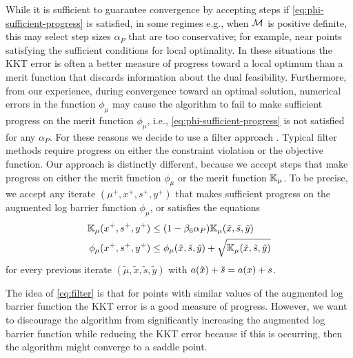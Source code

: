 \documentclass{article}
\begin{document}
While it is sufficient to guarantee convergence by accepting steps if \eqref{eq:phi-sufficient-progress} is satisfied, in some regimes e.g., when $\mathcal{M}$ is positive definite, this may select step sizes $\alpha_{P}$ that are too conservative;  for example, near points satisfying the sufficient conditions for local optimality. In these situations the KKT error is often a better measure of progress toward a local optimum than a merit function that discards information about the dual feasibility. Furthermore, from our experience, during convergence toward an optimal solution, numerical errors in the function $\phi_{\mu}$ may cause the algorithm to fail to make sufficient progress on the merit function $\phi_{\mu}$, i.e., \eqref{eq:phi-sufficient-progress} is not satisfied for any $\alpha_{P}$. For these reasons we decide to use a filter approach \cite{fletcher2002nonlinear,wachter2006implementation}. Typical filter methods \cite{fletcher2002nonlinear} require progress on either the constraint violation or the objective function. Our approach is distinctly different, because we accept steps that make progress on either the merit function $\phi_{\mu}$ or the merit function $\mathbb{K}_{\mu}$.
To be precise, we accept any iterate $(\mu^{+}, x^{+}, s^{+}, y^{+})$ that makes sufficient progress on the augmented log barrier function $\phi_{\mu}$, or satisfies the equations
\begin{subequations}\label{eq:filter}
\begin{flalign}
\meritKKT_{\mu} (x^{+}, s^{+}, y^{+}) &\le (1 - \parKKTReductFactor \alpha_{P} ) \meritKKT_{\mu} (\tilde{x}, \tilde{s}, \tilde{y}) \label{eq:kkt-progress} \\
\phi_{\mu}(x^{+}, s^{+}, y^{+}) &\le \phi_{\mu}(\tilde{x}, \tilde{s}, \tilde{y}) + \sqrt{\meritKKT_{\mu} (\tilde{x}, \tilde{s}, \tilde{y})} %
\end{flalign} %
\end{subequations}
 for every previous iterate $(\tilde{\mu}, \tilde{x}, \tilde{s}, \tilde{y})$ with $a(\tilde{x}) + \tilde{s} = a(x) + s$.

The idea of \eqref{eq:filter} is that for points with similar values of the augmented log barrier function the KKT error is a good measure of progress. However, we want to discourage the algorithm from significantly increasing the augmented log barrier function while reducing the KKT error because if this is occurring, then the algorithm might converge to a saddle point. 
\end{document}
